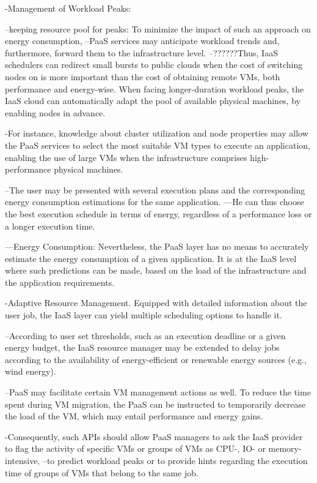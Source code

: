 -Management of Workload Peaks:

--keeping resource pool for peaks: To minimize the impact of such an approach on energy consumption, 
--PaaS services may anticipate workload trends and, furthermore, forward them to the infrastructure level. 
--??????Thus, IaaS schedulers can redirect small bursts to public clouds when the cost of switching nodes on is more important than the cost of obtaining remote VMs, both performance and energy-wise. When facing longer-duration workload peaks, the IaaS cloud can automatically adapt the pool of available physical machines, by enabling nodes in advance.

-For instance, knowledge about cluster utilization and node properties may allow the PaaS services to select the most suitable VM types to execute an application, enabling the use of large VMs when the infrastructure comprises high-performance physical machines.

--The user may be presented with several execution plans and the corresponding energy consumption estimations for the same application. 
---He can thus choose the best execution schedule in terms of energy, regardless of a performance loss or a longer execution time.

---Energy Consumption: Nevertheless, the PaaS layer has no means to accurately estimate the energy consumption of a given application. It is at the IaaS level where such predictions can be made, based on the load of the infrastructure and the application requirements.

-Adaptive Resource Management. Equipped with detailed information about the user job, the IaaS layer can yield multiple scheduling options to handle it. 

--According to user set thresholds, such as an execution deadline or a given energy budget, the IaaS resource manager may be extended to delay jobs according to the availability of energy-efficient or renewable energy sources (e.g., wind energy). 

--PaaS may facilitate certain VM management actions as well. To reduce the time spent during VM migration, the PaaS can be instructed to temporarily decrease the load of the VM, which may entail performance and energy gains.

-Consequently, such APIs should allow PaaS managers to ask the IaaS provider to flag the activity of specific VMs or groups of VMs as CPU-, IO- or memory-intensive, 
--to predict workload peaks or to provide hints regarding the execution time of groups of VMs that belong to the same job.

